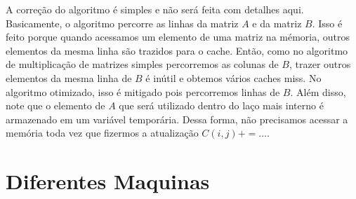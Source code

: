 \documentclass{article}
\begin{document}
A correção do algoritmo é simples e não será feita com detalhes aqui. Basicamente, o algoritmo percorre as linhas da matriz $A$ e da matriz $B$. Isso é feito porque quando acessamos um elemento de uma matriz na mémoria, outros elementos da mesma linha são trazidos para o cache. Então, como no algoritmo de multiplicação de matrizes simples percorremos as colunas de $B$, trazer outros elementos da mesma linha de $B$ é inútil e obtemos vários caches miss. No algoritmo otimizado, isso é mitigado pois percorremos linhas de $B$. Além disso, note que o elemento de $A$ que será utilizado dentro do laço mais interno é armazenado em um variável temporária. Dessa forma, não precisamos acessar a memória toda vez que fizermos a atualização $C(i,j) +=\ldots$.

\section{Diferentes Maquinas}
\end{document}
